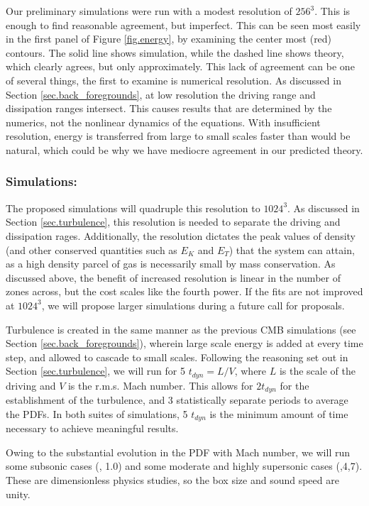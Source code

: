 Our preliminary simulations were run with a modest resolution of $256^3$.  This
is enough to find reasonable agreement, but imperfect. This can be seen most
easily in the first panel of Figure \ref{fig.energy}, by examining the center
most (red) contours. The solid line shows simulation, while the dashed line
shows theory, which clearly agrees, but only approximately.  This lack of
agreement can be one of several things, the first to examine is numerical
resolution.  As discussed in Section \ref{sec.back_foregrounds}, at low
resolution the driving range and dissipation ranges intersect.  This causes
results that are determined by the numerics, not the nonlinear dynamics of the
equations.  
With insufficient resolution, energy is transferred from large to
small scales faster than would be natural, which could be why we have mediocre
agreement in our predicted theory.  

\subsubsection{Simulations: \nameTurbulence}
\label{subsec.turb_sims}

The proposed simulations will quadruple this
resolution to $1024^3$.  As discussed in Section \ref{sec.turbulence},
this resolution is needed to separate the driving and dissipation rages.  
Additionally, the resolution dictates the peak values of density (and other
conserved quantities such as $E_K$ and $E_T$) that the system can attain, as a
high density parcel of gas is necessarily small by 
mass conservation.  As discussed above, the benefit of increased
resolution is linear in the number of zones across, but the cost scales like the
fourth power.  
If the
fits are not improved at $1024^3$, we will propose larger simulations during a
future call for proposals.

Turbulence is created in the same manner as the previous CMB simulations
(see Section \ref{sec.back_foregrounds}), wherein large scale energy is added at every time
step, and allowed to cascade to small scales.  Following the reasoning set out
in Section \ref{sec.turbulence}, we will run for 5 $t_{dyn}=L/V$, where $L$ is the
scale of the driving and $V$ is the r.m.s. Mach number.  This allows for $2
t_{dyn}$ for the establishment of the turbulence, and 3 statistically separate
periods to average the PDFs.  In both suites of simulations, 5 $t_{dyn}$ is the minimum
amount of time necessary to achieve meaningful results.

Owing to the substantial evolution in the PDF with Mach number, we
will run some subsonic cases (, 1.0) and some moderate and highly
supersonic cases (,4,7).   These are dimensionless physics
studies, so the box size and sound speed are unity.
